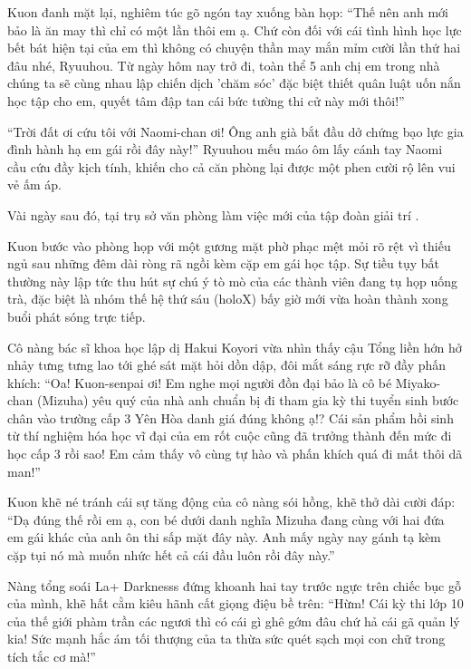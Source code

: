 \documentclass[../main.tex]{subfiles}
\begin{document}
Kuon đanh mặt lại, nghiêm túc gõ ngón tay xuống bàn họp: ``Thế nên anh mới bảo là ăn may thì chỉ có một lần thôi em ạ. Chứ còn đối với cái tình hình học lực bết bát hiện tại của em thì không có chuyện thần may mắn mỉm cười lần thứ hai đâu nhé, Ryuuhou. Từ ngày hôm nay trở đi, toàn thể 5 anh chị em trong nhà chúng ta sẽ cùng nhau lập chiến dịch 'chăm sóc' đặc biệt thiết quân luật uốn nắn học tập cho em, quyết tâm đập tan cái bức tường thi cử này mới thôi!''

``Trời đất ơi cứu tôi với Naomi-chan ơi! Ông anh già bắt đầu dở chứng bạo lực gia đình hành hạ em gái rồi đây này!'' Ryuuhou mếu máo ôm lấy cánh tay Naomi cầu cứu đầy kịch tính, khiến cho cả căn phòng lại được một phen cười rộ lên vui vẻ ấm áp.

\ct

\pov{-}

Vài ngày sau đó, tại trụ sở văn phòng làm việc mới của tập đoàn giải trí \hll.

Kuon bước vào phòng họp với một gương mặt phờ phạc mệt mỏi rõ rệt vì thiếu ngủ sau những đêm dài ròng rã ngồi kèm cặp em gái học tập. Sự tiều tụy bất thường này lập tức thu hút sự chú ý tò mò của các thành viên đang tụ họp uống trà, đặc biệt là nhóm thế hệ thứ sáu (holoX) bấy giờ mới vừa hoàn thành xong buổi phát sóng trực tiếp.

Cô nàng bác sĩ khoa học lập dị Hakui Koyori vừa nhìn thấy cậu Tổng liền hớn hở nhảy tưng tưng lao tới ghé sát mặt hỏi dồn dập, đôi mắt sáng rực rỡ đầy phấn khích: ``Oa! Kuon-senpai ơi! Em nghe mọi người đồn đại bảo là cô bé Miyako-chan (Mizuha) yêu quý của nhà anh chuẩn bị đi tham gia kỳ thi tuyển sinh bước chân vào trường cấp 3 Yên Hòa danh giá đúng không ạ!? Cái sản phẩm hồi sinh từ thí nghiệm hóa học vĩ đại của em rốt cuộc cũng đã trưởng thành đến mức đi học cấp 3 rồi sao! Em cảm thấy vô cùng tự hào và phấn khích quá đi mất thôi dã man!''

Kuon khẽ né tránh cái sự tăng động của cô nàng sói hồng, khẽ thở dài cười đáp: ``Dạ đúng thế rồi em ạ, con bé dưới danh nghĩa Mizuha đang cùng với hai đứa em gái khác của anh ôn thi sấp mặt đây này. Anh mấy ngày nay gánh tạ kèm cặp tụi nó mà muốn nhức hết cả cái đầu luôn rồi đây này.''

Nàng tổng soái La+ Darknesss đứng khoanh hai tay trước ngực trên chiếc bục gỗ của mình, khẽ hất cằm kiêu hãnh cất giọng điệu bề trên: ``Hừm! Cái kỳ thi lớp 10 của thế giới phàm trần các ngươi thì có cái gì ghê gớm đâu chứ hả cái gã quản lý kia! Sức mạnh hắc ám tối thượng của ta thừa sức quét sạch mọi con chữ trong tích tắc cơ mà!''
\end{document}
